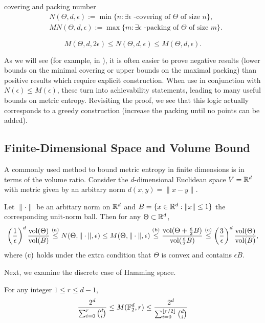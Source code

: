covering and packing number 
\begin{align*}
    &N(\Theta,d,\epsilon):=\min\{n:\exists \epsilon\text{ -covering of }\Theta\text{ of size }n\},\\
    &MN(\Theta,d,\epsilon):=\max\{m:\exists \epsilon\text{ -packing of }\Theta\text{ of size }m\}.
\end{align*}

\begin{theorem}
    \[M(\Theta,d,2\epsilon)\leq N(\Theta,d,\epsilon)\leq M(\Theta,d,\epsilon).\]
\end{theorem}
\begin{remark}
    As we will see (for example, in ), it is often easier to prove negative results (lower bounds on the minimal covering or upper bounds on the maximal packing) than positive results which require explicit construction.
    When use in conjunction with $N(\epsilon)\leq M(\epsilon)$, these turn into achievability statements, leading to many useful bounds on metric entropy.
    Revisiting the proof, we see that this logic actually corresponds to a greedy construction (increase the packing until no points can be added).
\end{remark}

\subsection{Finite-Dimensional Space and Volume Bound}

A commonly used method to bound metric entropy in finite dimensions is in terms of the volume ratio.
Consider the $d$-dimensional Euclidean space $V=\mathbb{R}^d$ with metric given by an arbitary norm $d(x,y)=\|x-y\|$.
\begin{theorem}\label{thm:volume-bound}
    Let $\|\cdot\|$ be an arbitary norm on $\mathbb{R}^d$ and $B=\{x\in\mathbb{R}^d:\|x\|\leq 1\}$ the corresponding unit-norm ball.
    Then for any $\Theta\subset\mathbb{R}^d$,
    \[\left(\frac{1}{\epsilon}\right)^d\frac{\operatorname{vol}(\Theta)}{\operatorname{vol}(B)}\stackrel{(\rm a)}{\leq} N(\Theta,\|\cdot\|,\epsilon)\leq M(\Theta,\|\cdot\|,\epsilon)\stackrel{(\rm b)}{\leq} \frac{\operatorname{vol}(\Theta+\frac{\epsilon}{2}B)}{\operatorname{vol}(\frac{\epsilon}{2}B)}\stackrel{(\rm c)}{\leq}\left(\frac{3}{\epsilon}\right)^d\frac{\operatorname{vol}(\Theta)}{\operatorname{vol}(B)},\]
    where $(\rm c)$ holds under the extra condition that $\Theta$ is convex and contains $\epsilon B$.
\end{theorem}


Next, we examine the discrete case of Hamming space.
\begin{theorem}
    For any integer $1\leq r\leq d-1$,
    \[\frac{2^d}{\sum_{i=0}^{r}{d\choose i}}\leq M(\mathbb{F}_2^d,r)\leq \frac{2^d}{\sum_{i=0}^{\lfloor r/2\rfloor}{d\choose i}}\]
\end{theorem}

